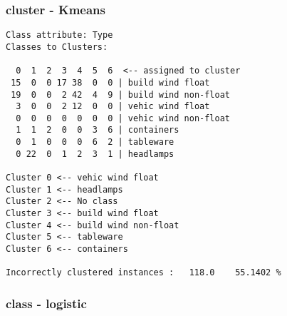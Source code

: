 \documentclass[a4paper]{article}
\begin{document}
\subsubsection{cluster - Kmeans}

\begin{verbatim}
Class attribute: Type
Classes to Clusters:

  0  1  2  3  4  5  6  <-- assigned to cluster
 15  0  0 17 38  0  0 | build wind float
 19  0  0  2 42  4  9 | build wind non-float
  3  0  0  2 12  0  0 | vehic wind float
  0  0  0  0  0  0  0 | vehic wind non-float
  1  1  2  0  0  3  6 | containers
  0  1  0  0  0  6  2 | tableware
  0 22  0  1  2  3  1 | headlamps

Cluster 0 <-- vehic wind float
Cluster 1 <-- headlamps
Cluster 2 <-- No class
Cluster 3 <-- build wind float
Cluster 4 <-- build wind non-float
Cluster 5 <-- tableware
Cluster 6 <-- containers

Incorrectly clustered instances :	118.0	 55.1402 %

\end{verbatim}


\subsubsection{class - logistic}
\end{document}
